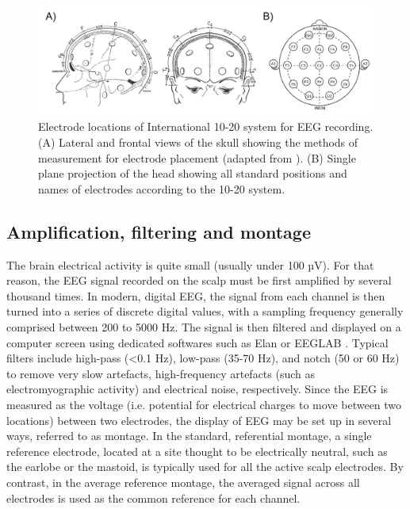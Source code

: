 \begin{figure}[htb]
	\includegraphics[width=\textwidth]{Fig/Methods/EEG_10-20/EEG_10-20.png}
	\caption[Electrode locations of International 10-20 system for EEG recording]{Electrode locations of International 10-20 system for EEG recording. (A) Lateral and frontal views of the skull showing the methods of measurement for electrode placement (adapted from \citealp{klem_ten-twenty_1999}). (B) Single plane projection of the head showing all standard positions and names of electrodes according to the 10-20 system. }
	\label{fig:methods:10-20}
\end{figure}

\subsection{Amplification, filtering and montage}
\label{sec:eeg:eeg:ampli}

The brain electrical activity is quite small (usually under 100 µV). For that reason, the EEG signal recorded on the scalp must be first amplified by several thousand times. In modern, digital EEG, the signal from each channel is then turned into a series of discrete digital values, with a sampling frequency generally comprised between 200 to 5000 Hz. The signal is then filtered and displayed on a computer screen using dedicated softwares such as Elan \citep{aguera_elan:_2011} or EEGLAB \citep{delorme_eeglab:_2004}. Typical filters include high-pass (<0.1 Hz), low-pass (35-70 Hz), and notch (50 or 60 Hz) to remove very slow artefacts, high-frequency artefacts (such as electromyographic activity) and electrical noise, respectively.
Since the EEG is measured as the voltage (i.e. potential for electrical charges to move between two locations) between two electrodes, the display of EEG may be set up in several ways, referred to as montage. In the standard, referential montage, a single reference electrode, located at a site thought to be electrically neutral, such as the earlobe or the mastoid, is typically used for all the active scalp electrodes. By contrast, in the average reference montage, the averaged signal across all electrodes is used as the common reference for each channel.


